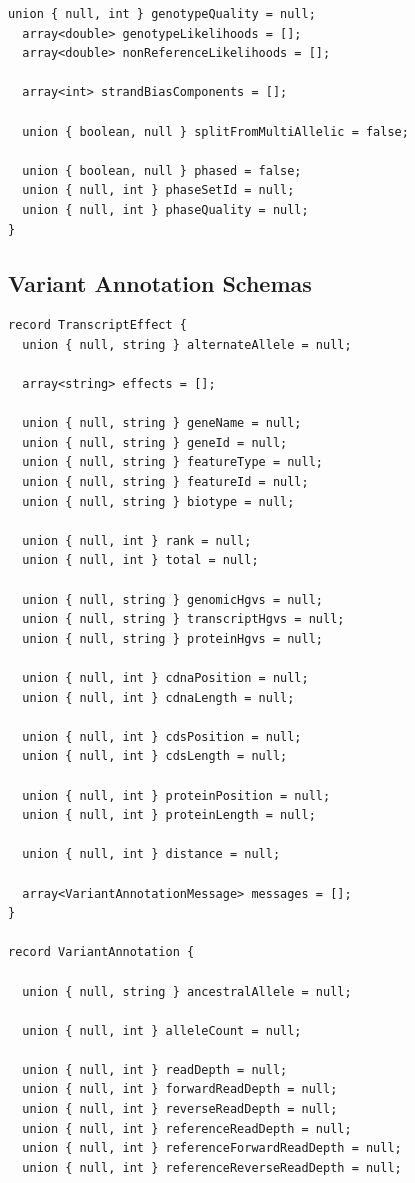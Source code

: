 \documentclass[phd]{ucbthesis}
\begin{document}
\begin{lstlisting}[caption={ADAM} core variant and genotype schemas]
  union { null, int } genotypeQuality = null;
  array<double> genotypeLikelihoods = [];
  array<double> nonReferenceLikelihoods = [];

  array<int> strandBiasComponents = [];

  union { boolean, null } splitFromMultiAllelic = false;

  union { boolean, null } phased = false;
  union { null, int } phaseSetId = null;
  union { null, int } phaseQuality = null;
}
\end{lstlisting}

\subsection{Variant Annotation Schemas}
\label{sec:variant-annotation-schemas}

\begin{lstlisting}[caption={ADAM} variant annotation schemas]
record TranscriptEffect {
  union { null, string } alternateAllele = null;

  array<string> effects = [];

  union { null, string } geneName = null;
  union { null, string } geneId = null;
  union { null, string } featureType = null;
  union { null, string } featureId = null;
  union { null, string } biotype = null;

  union { null, int } rank = null;
  union { null, int } total = null;

  union { null, string } genomicHgvs = null;
  union { null, string } transcriptHgvs = null;
  union { null, string } proteinHgvs = null;

  union { null, int } cdnaPosition = null;
  union { null, int } cdnaLength = null;

  union { null, int } cdsPosition = null;
  union { null, int } cdsLength = null;

  union { null, int } proteinPosition = null;
  union { null, int } proteinLength = null;

  union { null, int } distance = null;

  array<VariantAnnotationMessage> messages = [];
}

record VariantAnnotation {

  union { null, string } ancestralAllele = null;

  union { null, int } alleleCount = null;

  union { null, int } readDepth = null;
  union { null, int } forwardReadDepth = null;
  union { null, int } reverseReadDepth = null;
  union { null, int } referenceReadDepth = null;
  union { null, int } referenceForwardReadDepth = null;
  union { null, int } referenceReverseReadDepth = null;


\end{lstlisting}
\end{document}
